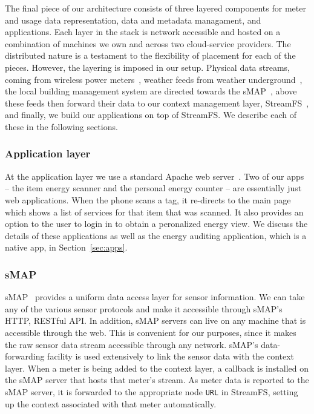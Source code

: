 The final piece of our architecture consists of three layered
components for meter and usage data representation,
data and metadata managament, and applications.  Each layer in the stack is network accessible and hosted on a combination
of machines we own and across two cloud-service providers.  The distributed nature is a testament to the flexibility of
placement for each of the pieces.  However, the layering is imposed in our setup.  Physical data streams,
coming from wireless power meters~\cite{acme}, weather feeds from weather underground~\cite{weatherunderground}, the
local building management system are directed towards the sMAP~\cite{smap}, above these feeds then forward their data
to our context management layer, StreamFS~\cite{streamfs}, and finally, we build our applications on top of StreamFS.
We describe each of these in the following sections.

\subsubsection{Application layer}
At the application layer we use a standard Apache web server~\cite{apache}.  Two of our apps -- the item
energy scanner and the personal energy counter -- are essentially just web applications.  When the phone scans a tag, it
re-directs to the main page which shows a list of services for that item that was scanned.  It also provides an option
to the user to login in to obtain a peronalized energy view.  We discuss the details of these applications as well
as the energy auditing application, which is a native app, in Section~\ref{sec:apps}.

\subsubsection{sMAP}
\label{sec:smap}
sMAP~\cite{smap} provides a uniform data access layer for sensor information.  We can take any of the various sensor protocols
and make it accessible through sMAP's HTTP, RESTful API.  In addition, sMAP servers can live on any machine that is accessible
through the web.  This is convenient for our purposes, since it makes the raw sensor data stream accessible through any network.
sMAP's data-forwarding facility is used extensively to link the sensor data with the context layer.  When a meter is being added
to the context layer, a callback is installed on the sMAP server that hosts that meter's stream.  As meter data is reported 
to the sMAP server, it is forwarded to the appropriate node {\tt URL} in StreamFS, setting up the context associated with that
meter automatically.

